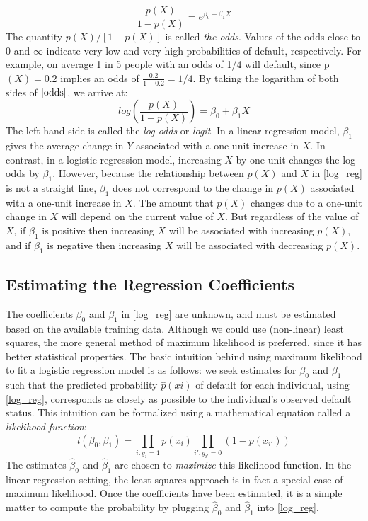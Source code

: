 \begin{equation}
    \frac{p(X)}{1 - p(X)} = e^{\beta_0 + \beta_1X}
    \label{odds}
\end{equation}
The quantity $p(X)/[1-p(X)]$ is called \textit{the odds}. Values of the odds close to 0 and $\infty$ indicate very low and very high probabilities of default, respectively. For example, on average 1 in 5 people with an odds of 1/4 will default, since p$(X)=0.2$ implies an odds of $\frac{0.2}{1 - 0.2} = 1/4$. By taking the logarithm of both sides of $\ref{odds}$, we arrive at:
\[log\left(\frac{p(X)}{1 - p(X)}\right) = \beta_0 + \beta_1X\]
The left-hand side is called the \textit{log-odds} or \textit{logit}. In a linear regression model, $\beta_1$ gives the average change in $Y$ associated with a one-unit increase in $X$. In contrast, in a logistic regression model, increasing $X$ by one unit changes the log odds by $\beta_1$. However, because the relationship between $p(X)$ and $X$ in \ref{log_reg} is not a straight line, $\beta_1$ does not correspond to the change in $p(X)$ associated with a one-unit increase in $X$. The amount that $p(X)$ changes due to a one-unit change in $X$ will depend on the current value of $X$. But regardless of the value of $X$, if $\beta_1$ is positive then increasing $X$ will be associated with increasing $p(X)$, and if $\beta_1$ is negative then increasing $X$ will be associated with decreasing $p(X)$.

\subsection{Estimating the Regression Coefficients}
The coefficients $\beta_0$ and $\beta_1$ in \ref{log_reg} are unknown, and must be estimated based on the available training data. Although we could use (non-linear) least squares, the more general method of maximum likelihood is preferred, since it has better statistical properties. The basic intuition behind using maximum likelihood
to fit a logistic regression model is as follows: we seek estimates for $\beta_0$ and
$\beta_1$ such that the predicted probability $\hat{p}(xi)$ of default for each individual, using \ref{log_reg}, corresponds as closely as possible to the individual’s observed default status. This intuition can be formalized using a mathematical equation called a \textit{likelihood function}:
\[l(\beta_0, \beta_1) = \prod_{i:y_i = 1} p(x_i) \prod_{i':y_{i'}=0} (1 - p(x_{i'}))\]
The estimates $\hat\beta_0$ and $\hat\beta_1$ are chosen to \textit{maximize} this likelihood function. In the linear regression setting, the least squares approach is in fact a special case of maximum likelihood. Once the coefficients have been estimated, it is a simple matter to compute the probability by plugging  $\hat\beta_0$ and $\hat\beta_1$ into \ref{log_reg}.

